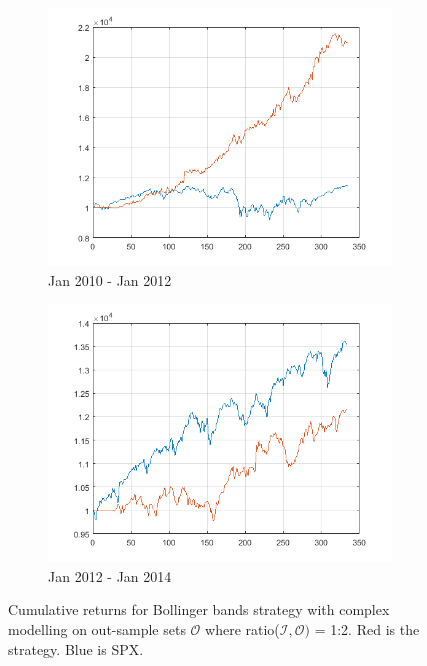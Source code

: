 \documentclass[11pt,a4,twosided,singlespacing,titlepagenumber=on]{scrreprt}
\numberwithin{equation}{chapter} %
\theoremstyle{remark}
\begin{document}
\begin{figure}[H]
\begin{subfigure}[t]{0.32\textwidth}
        \includegraphics[width=1\textwidth]{res/backtest_cpx/11}
        \caption{Jan 2010 - Jan 2012}
    \end{subfigure}
    \begin{subfigure}[t]{0.32\textwidth}
        \centering
        \includegraphics[width=1\textwidth]{res/backtest_cpx/12}
        \caption{Jan 2012 - Jan 2014}
    \end{subfigure}
    \caption{Cumulative returns for Bollinger bands strategy with complex modelling on out-sample sets $\mathcal{O}$ where ratio($\mathcal{I}, \mathcal{O})$ = 1:2. Red is the strategy. Blue is SPX.}
    \label{fig:bollinger_bands_strategy_simple}
\end{figure}
\end{document}
